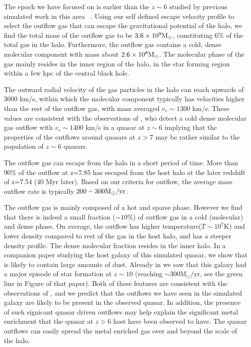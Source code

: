 \documentclass[a4paper,usenatbib]{mnras}
\begin{document}
The epoch we have focused on is earlier than the $z\sim6$ studied by previous simulated work in this area ~\citep[e.g.][]{Costa, Curtis, Biernacki, Barai2018}.
Using our self defined escape velocity profile to select the outflow gas that can escape the gravitational potential of the halo, we find the total mass of the outflow gas to be $3.6\times 10^{9} \rm{M}_\odot$, constituting 6\% of the total gas in the halo. 
Furthermore, the outflow gas contains a cold, dense molecular component with mass about $2.6\times 10^{8}\rm {M}_\odot$. The molecular phase of the gas mainly resides in the inner region of the halo,  in the star forming region within a few kpc of the central black hole. 

The outward radial velocity of the gas particles in the halo can reach upwards of $3000$ km/s, within which the molecular component typically has velocities higher than the rest of the outflow gas, with mass averaged $v_r \sim 1300$ km/s. These values are consistent with the observations of \cite{Cicone2015}, who detect a cold dense molecular gas outflow with $v_r \sim 1400$ km/s in a quasar at $z\sim 6$ implying that the properties
of the outflows around quasars at $z > 7$ may be rather similar to the population of $z\sim 6$ quasars.

The outflow gas can escape from the halo in a short period of time. More than 90\% of the outflow at z=7.85 has escaped from the host halo at the later redshift of z=7.54 (40 Myr later). 
Based on our criteria for outflow, the average mass outflow rate is typically $200-300 \rm {M}_\odot/\mathrm{yr}$.


The outflow gas is mainly composed of a hot and sparse phase. However we find that there is indeed a small fraction ($\sim 10$\%) of outflow gas in a cold (molecular) and dense phase.
On average, the outflow has higher temperature($T \sim 10^7 $K) and lower density compared to rest of the gas in the host halo, and has a steeper density profile. The dense molecular fraction resides in the inner halo. In a companion paper \cite{Tenneti2018} studying the host galaxy of this simulated quasar, we show that is likely to contain large amounts of dust. Already in \cite{DiMatteo2017} we saw that this galaxy had a major episode of star formation at $z\sim 10$
(reaching $\sim 300  {\mathrm M}_\odot/\mathrm{yr}$, see the green line in Figure of that paper). Both of these features are consistent with the observations of \cite{Venemans2017}, and we predict that the outflows we have seen in the simulated galaxy are likely to be present in the observed quasar. In addition, the presence of such signicant quasar driven outflows may help explain the significant metal enrichment that the quasar at $z> 6$ host have been observed to have. The quasar outflows can easily spread the metal enriched 
gas over and beyond the scale of the halo.
\end{document}
